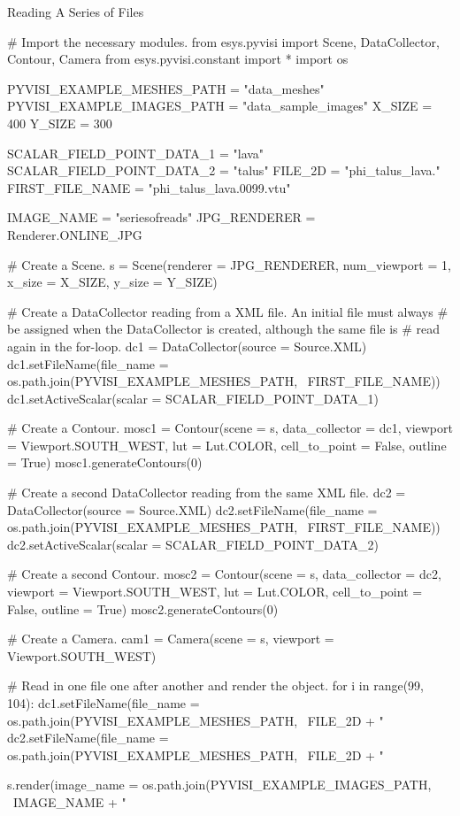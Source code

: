\textsf{Reading A Series of Files}

\begin{python}
# Import the necessary modules.
from esys.pyvisi import Scene, DataCollector, Contour, Camera 
from esys.pyvisi.constant import *
import os

PYVISI_EXAMPLE_MESHES_PATH = "data_meshes"
PYVISI_EXAMPLE_IMAGES_PATH = "data_sample_images"
X_SIZE = 400
Y_SIZE = 300

SCALAR_FIELD_POINT_DATA_1 = "lava"
SCALAR_FIELD_POINT_DATA_2 = "talus"
FILE_2D = "phi_talus_lava."
FIRST_FILE_NAME = "phi_talus_lava.0099.vtu"

IMAGE_NAME = "seriesofreads"
JPG_RENDERER = Renderer.ONLINE_JPG

# Create a Scene.
s = Scene(renderer = JPG_RENDERER, num_viewport = 1, x_size = X_SIZE, 
        y_size = Y_SIZE)

# Create a DataCollector reading from a XML file. An initial file must always
# be assigned when the DataCollector is created, although the same file is 
# read again in the for-loop.   
dc1 = DataCollector(source = Source.XML)
dc1.setFileName(file_name = os.path.join(PYVISI_EXAMPLE_MESHES_PATH, \
        FIRST_FILE_NAME))
dc1.setActiveScalar(scalar = SCALAR_FIELD_POINT_DATA_1)

# Create a Contour.
mosc1 = Contour(scene = s, data_collector = dc1, 
        viewport = Viewport.SOUTH_WEST, lut = Lut.COLOR, cell_to_point = False,
        outline = True)
mosc1.generateContours(0)

# Create a second DataCollector reading from the same XML file. 
dc2 = DataCollector(source = Source.XML)
dc2.setFileName(file_name = os.path.join(PYVISI_EXAMPLE_MESHES_PATH, \
        FIRST_FILE_NAME))
dc2.setActiveScalar(scalar = SCALAR_FIELD_POINT_DATA_2)

# Create a second Contour.
mosc2 = Contour(scene = s, data_collector = dc2, 
        viewport = Viewport.SOUTH_WEST, lut = Lut.COLOR, cell_to_point = False,
        outline = True)
mosc2.generateContours(0)

# Create a Camera.
cam1 = Camera(scene = s, viewport = Viewport.SOUTH_WEST)

# Read in one file one after another and render the object. 
for i in range(99, 104):
    dc1.setFileName(file_name =  os.path.join(PYVISI_EXAMPLE_MESHES_PATH, \
	        FILE_2D + "%
    dc2.setFileName(file_name =  os.path.join(PYVISI_EXAMPLE_MESHES_PATH, \
            FILE_2D + "%

    s.render(image_name = os.path.join(PYVISI_EXAMPLE_IMAGES_PATH, \
            IMAGE_NAME + "%
\end{python}

